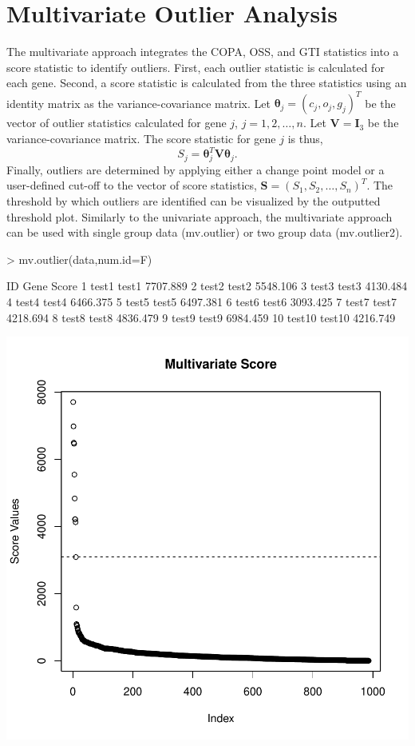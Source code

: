 \documentclass[11pt, a4paper]{article}
\begin{document}
\section{Multivariate Outlier Analysis}
The multivariate approach integrates the COPA, OSS, and GTI statistics into a score statistic to identify outliers. First, each outlier statistic is calculated for each gene. Second, a score statistic is calculated from the three statistics using an identity matrix as the variance-covariance matrix. Let $\mathbf{\theta}_j=(c_j,o_j,g_j)^T$ be the vector of outlier statistics calculated for gene $j$, $j=1,2,\dots,n$. Let $\mathbf{V}=\mathbf{I}_3$ be the variance-covariance matrix. The score statistic for gene $j$ is thus,
\begin{equation}
S_j=\mathbf{\theta}_j^T \mathbf{V} \mathbf{\theta}_j.
\end{equation}
Finally, outliers are determined by applying either a change point model \cite{cpm} or a user-defined cut-off to the vector of score statistics, $\mathbf{S}=(S_1,S_2,\dots,S_n)^T$. The threshold by which outliers are identified can be visualized by the outputted threshold plot. Similarly to the univariate approach, the multivariate approach can be used with single group data (mv.outlier) or two group data (mv.outlier2).
\begin{Schunk}
\begin{Sinput}
> mv.outlier(data,num.id=F)
\end{Sinput}
\begin{Soutput}
       ID   Gene    Score
1   test1  test1 7707.889
2   test2  test2 5548.106
3   test3  test3 4130.484
4   test4  test4 6466.375
5   test5  test5 6497.381
6   test6  test6 3093.425
7   test7  test7 4218.694
8   test8  test8 4836.479
9   test9  test9 6984.459
10 test10 test10 4216.749
\end{Soutput}
\end{Schunk}
\includegraphics{roapkg-010}
\end{document}
